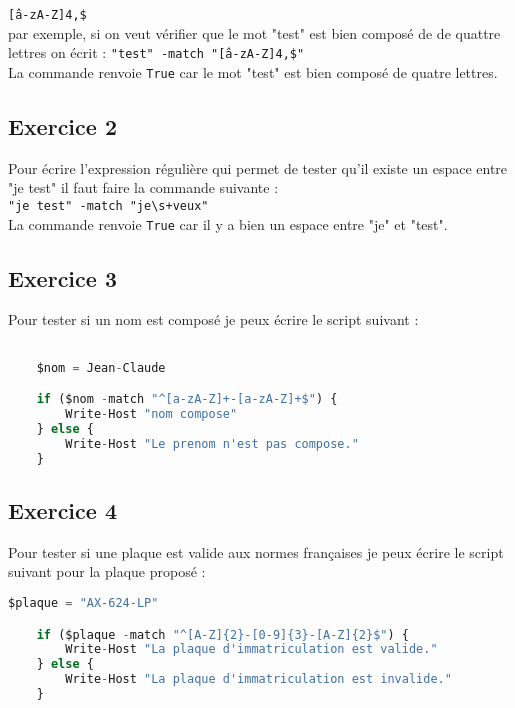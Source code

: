 \documentclass[12pt, a4paper]{article}
\begin{document}
\texttt{\^[a-zA-Z]{4,}\$}\\

par exemple, si on veut vérifier que le mot "test" est bien composé de de quattre lettres on écrit : 
\texttt{"test" -match "\^[a-zA-Z]{4,}\$"}\\

La commande renvoie \texttt{True} car le mot "test" est bien composé de quatre lettres.\\


\subsection{Exercice 2}
Pour écrire l’expression régulière qui permet de tester qu’il existe un espace entre "je test"
il faut faire la commande suivante :\\

\texttt{"je test" -match "je\textbackslash s+veux"}\\

La commande renvoie \texttt{True} car il y a bien un espace entre "je" et "test".\\

\newpage
\subsection{Exercice 3}
Pour tester si un nom est composé je peux écrire le script suivant :\\

\begin{lstlisting}[language=Python]

    $nom = Jean-Claude

    if ($nom -match "^[a-zA-Z]+-[a-zA-Z]+$") {
        Write-Host "nom compose"
    } else {
        Write-Host "Le prenom n'est pas compose."
    }

\end{lstlisting}


\subsection{Exercice 4}
Pour tester si une plaque est valide aux normes françaises je peux écrire le script
suivant pour la plaque proposé :\\

\begin{lstlisting}[language=Python]
    $plaque = "AX-624-LP"

    if ($plaque -match "^[A-Z]{2}-[0-9]{3}-[A-Z]{2}$") {
        Write-Host "La plaque d'immatriculation est valide."
    } else {
        Write-Host "La plaque d'immatriculation est invalide."
    }
\end{lstlisting}
\end{document}
